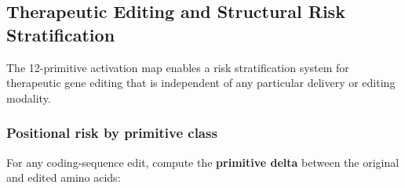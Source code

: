 \documentclass[12pt,a4paper]{article}
\begin{document}
\subsection{Therapeutic Editing and Structural Risk Stratification}

The 12-primitive activation map enables a risk stratification system for therapeutic gene editing that is independent of any particular delivery or editing modality.

\subsubsection{Positional risk by primitive class}

For any coding-sequence edit, compute the \textbf{primitive delta} between the original and edited amino acids:
\end{document}

